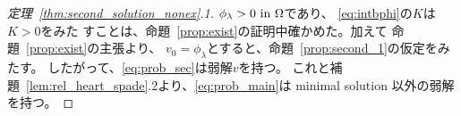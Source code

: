 \begin{proof}[定理~\ref{thm:second_solution_nonex}.1]
 $\phi_\lambda > 0 ~\text{in}~ \Omega$であり、
 \eqref{eq:intbphi}の$K$は$K > 0$をみた
 すことは、命題~\ref{prop:exist}の証明中確かめた。加えて
 命題~\ref{prop:exist}の主張より、
 $v_0 = \phi_\lambda$とすると、命題~\ref{prop:second_1}の仮定をみたす。
 したがって、\ref{eq:prob_sec}は弱解$v$を持つ。
 これと補題~\ref{lem:rel_heart_spade}.2より、\ref{eq:prob_main}は
 minimal solution 以外の弱解を持つ。 \qedhere
\end{proof}


